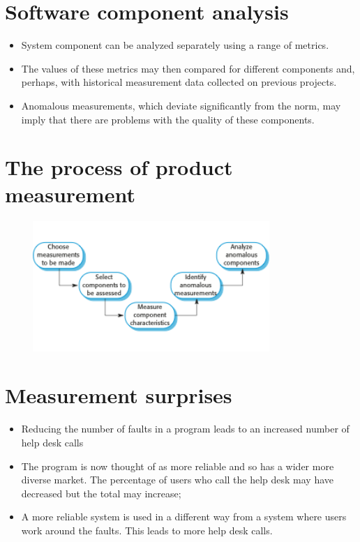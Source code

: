 \section {Software component analysis}
\begin{itemize}

\item System component can be analyzed separately using a range of metrics.

\item The values of these metrics may then compared for different components and, perhaps, with historical measurement data collected on previous projects.

\item Anomalous measurements, which deviate significantly from the norm, may imply that there are problems with the quality of these components.


\end{itemize}
\section {The process of product measurement}
\begin{figure}[h!]
    \centering
    \includegraphics[width = 0.8\textwidth]{./figures/L7_8.png}
    \caption{}
    \label{fig:L7_8}
\end{figure}



\section {Measurement surprises}
\begin{itemize}
\item Reducing the number of faults in a program leads to an increased number of help desk calls

  \item The program is now thought of as more reliable and so has a wider more diverse market. The percentage of users who call the help desk may have decreased but the total may increase;
  \item A more reliable system is used in a different way from a system where users work around the faults. This leads to more help desk calls.

\end{itemize}

